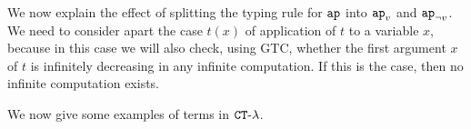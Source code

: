 
\begin{remark}
We now explain the effect of splitting the typing rule for ${\tt ap}$ into $\apvar$ and $\apnotvar$.
We need to consider apart the case $t(x)$ of application of $t$ to a variable
$x$, because in this case we will also check, using GTC, 
whether the first argument $x$ of $t$ is infinitely decreasing in any infinite 
computation. If this is the case, then no infinite computation exists. 
\end{remark}

We now give some examples of terms in ${ {\tt CT}\mbox{-}\lambda}$. 



